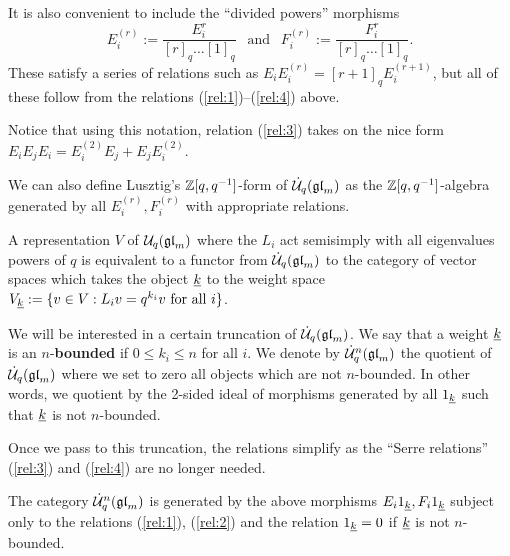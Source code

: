 \documentclass[11pt,leqno]{article}
\begin{document}
It is also convenient to include the ``divided powers'' morphisms
$$E_i^{(r)} := \frac{E_i^r}{[r]_q \dots [1]_q} \ \ \text{ and } \ \ F_i^{(r)} := \frac{F_i^r}{[r]_q \dots [1]_q}.$$
These satisfy a series of relations such as
$ E_i E_i^{(r)} = [r+1]_q E_i^{(r+1)}$, but all of these follow from the relations (\ref{rel:1})--(\ref{rel:4}) above.

Notice that using this notation, relation (\ref{rel:3}) takes on the nice form $E_iE_jE_i = E_i^{(2)}E_j + E_jE_i^{(2)}$.

\begin{rem}
We can also define Lusztig's ${\mathbb{Z}}[q, q^{-1}] $-form of $ \dot{{\mathcal{U}}}_q({\mathfrak{gl}}_m) $ as the $ {\mathbb{Z}}[q,q^{-1}]$-algebra generated by all $ E_i^{(r)}, F_i^{(r)} $ with appropriate relations.
\end{rem}

A representation $ V $ of $ \mathcal{U}_q({\mathfrak{gl}}_m) $ where the $ L_i $ act semisimply with all eigenvalues powers of $ q $ is equivalent to a functor from $ \dot{{\mathcal{U}}}_q({\mathfrak{gl}}_m) $ to the category of vector spaces which takes the object $ {\underline{k}} $ to the weight space $ V_{{\underline{k}}} := \{ v \in V : L_i v = q^{k_i} v \text{ for all } i \} $. 

We will be interested in a certain truncation of $ \dot{{\mathcal{U}}}_q({\mathfrak{gl}}_m) $.  We say that a weight $ {\underline{k}} $ is an $n$-\textbf{bounded} if $ 0 \le k_i \le n $ for all $ i$.  We denote by $\dot{{\mathcal{U}}}_q^n({\mathfrak{gl}}_m)$ the quotient of $\dot{{\mathcal{U}}}_q({\mathfrak{gl}}_m)$ where we set to zero all objects which are not $n$-bounded. In other words, we quotient by the 2-sided ideal of morphisms generated by all $ 1_{{\underline{k}}} $ such that $ {\underline{k}} $ is not $ n$-bounded.

Once we pass to this truncation, the relations simplify as the ``Serre relations'' (\ref{rel:3}) and (\ref{rel:4}) are no longer needed.

\begin{prop} \label{th:quotientrelations}
The category $ \dot{{\mathcal{U}}}_q^n({\mathfrak{gl}}_m) $ is generated by the above morphisms $ E_i 1_{{\underline{k}}}, F_i 1_{{\underline{k}}} $ subject only to the relations (\ref{rel:1}), (\ref{rel:2}) and the relation $ 1_{{\underline{k}}} = 0 $ if $ {\underline{k}} $ is not $ n$-bounded.
\end{prop}

\end{document}
